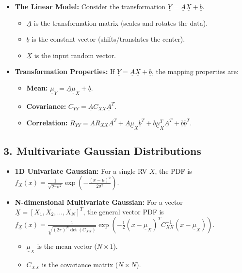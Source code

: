 \documentclass[12pt]{article}
\begin{document}
\begin{itemize}
    \item \textbf{The Linear Model:} Consider the transformation $\underline{Y} = \underline{A}\underline{X} + \underline{b}$.
    \begin{itemize}
        \item $\underline{A}$ is the transformation matrix (scales and rotates the data).
        \item $\underline{b}$ is the constant vector (shifts/translates the center).
        \item $\underline{X}$ is the input random vector.
    \end{itemize}
    \item \textbf{Transformation Properties:} If $\underline{Y} = \underline{A}\underline{X} + \underline{b}$, the mapping properties are:
    \begin{itemize}
        \item \textbf{Mean:} $\underline{\mu}_Y = \underline{A}\underline{\mu}_X + \underline{b}$.
        \item \textbf{Covariance:} $C_{YY} = \underline{A}C_{XX}\underline{A}^T$.
        \item \textbf{Correlation:} $R_{YY} = \underline{A}R_{XX}\underline{A}^T + \underline{A}\underline{\mu}_X\underline{b}^T + \underline{b}\underline{\mu}_X^T\underline{A}^T + \underline{b}\underline{b}^T$.
    \end{itemize}
\end{itemize}

\subsection*{3. Multivariate Gaussian Distributions}

\begin{itemize}
    \item \textbf{1D Univariate Gaussian:} For a single RV $X$, the PDF is $f_X(x) = \frac{1}{\sqrt{2\pi\sigma^2}} \exp\left(-\frac{(x-\mu)^2}{2\sigma^2}\right)$.
    \item \textbf{N-dimensional Multivariate Gaussian:} For a vector $\underline{X} = [X_1, X_2, \dots, X_N]^T$, the general vector PDF is $f_{\underline{X}}(x) = \frac{1}{\sqrt{(2\pi)^N \det(C_{XX})}} \exp\left(-\frac{1}{2}(x - \underline{\mu}_X)^T C_{XX}^{-1}(x - \underline{\mu}_X)\right)$.
    \begin{itemize}
        \item $\underline{\mu}_X$ is the mean vector ($N \times 1$).
        \item $C_{XX}$ is the covariance matrix ($N \times N$).
    \end{itemize}
\end{itemize}
\end{document}
